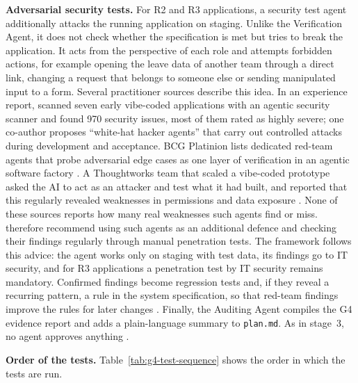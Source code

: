 \documentclass[10pt,a4paper]{article}
\begin{document}
\textbf{Adversarial security tests.}
\label{sec:adversarial-security-tests}
For R2 and R3 applications, a security test agent additionally attacks the
running application on staging. Unlike the Verification Agent, it does not
check whether the specification is met but tries to break the application.
It acts from the perspective of each role and attempts forbidden actions,
for example opening the leave data of another team through a direct link,
changing a request that belongs to someone else or sending manipulated
input to a form. Several practitioner sources describe this idea. In an
experience report, \textcite{waseem2025} scanned seven early vibe-coded
applications with an agentic security scanner and found 970 security
issues, most of them rated as highly severe; one co-author proposes
\enquote{white-hat hacker agents} that carry out controlled attacks during
development and acceptance. BCG Platinion lists dedicated red-team agents
that probe adversarial edge cases as one layer of verification in an
agentic software factory \parencite{bcgplatinion2026agentic}. A
Thoughtworks team that scaled a vibe-coded prototype asked the AI to act as
an attacker and test what it had built, and reported that this regularly
revealed weaknesses in permissions and data exposure
\parencite{TODO-koul2026vibesec}. None of these sources reports how many
real weaknesses such agents find or miss. \textcite{waseem2025} therefore
recommend using such agents as an additional defence and checking their
findings regularly through manual penetration tests. The framework follows
this advice: the agent works only on staging with test data, its findings
go to IT security, and for R3 applications a penetration test by IT
security remains mandatory. Confirmed findings become regression tests
and, if they reveal a recurring pattern, a rule in the system
specification, so that red-team findings improve the rules for later
changes \parencite{bcgplatinion2026agentic}. Finally, the Auditing Agent
compiles the G4 evidence report and adds a plain-language summary to
\texttt{plan.md}. As in stage~3, no agent approves anything
\parencite{alhasan2026}.

\textbf{Order of the tests.} Table~\ref{tab:g4-test-sequence} shows the order
in which the tests are run.
\end{document}
